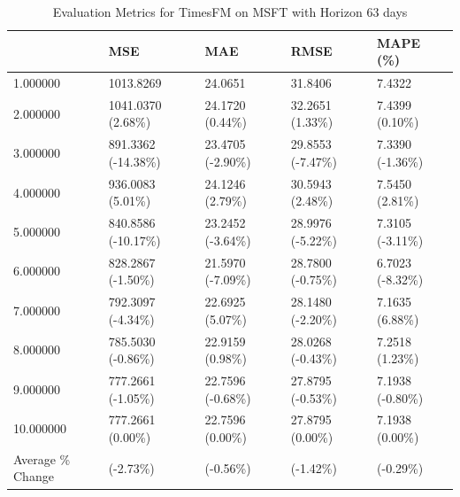 \begin{table}
\caption{Evaluation Metrics for TimesFM on MSFT with Horizon 63 days}
\label{tab:fm_MSFT_h63_metrics}
\begin{tabular}{lllll}
\toprule
 & MSE & MAE & RMSE & MAPE (\%) \\
\midrule
1.000000 & 1013.8269 & 24.0651 & 31.8406 & 7.4322 \\
2.000000 & 1041.0370 (2.68\%) & 24.1720 (0.44\%) & 32.2651 (1.33\%) & 7.4399 (0.10\%) \\
3.000000 & 891.3362 (-14.38\%) & 23.4705 (-2.90\%) & 29.8553 (-7.47\%) & 7.3390 (-1.36\%) \\
4.000000 & 936.0083 (5.01\%) & 24.1246 (2.79\%) & 30.5943 (2.48\%) & 7.5450 (2.81\%) \\
5.000000 & 840.8586 (-10.17\%) & 23.2452 (-3.64\%) & 28.9976 (-5.22\%) & 7.3105 (-3.11\%) \\
6.000000 & 828.2867 (-1.50\%) & 21.5970 (-7.09\%) & 28.7800 (-0.75\%) & 6.7023 (-8.32\%) \\
7.000000 & 792.3097 (-4.34\%) & 22.6925 (5.07\%) & 28.1480 (-2.20\%) & 7.1635 (6.88\%) \\
8.000000 & 785.5030 (-0.86\%) & 22.9159 (0.98\%) & 28.0268 (-0.43\%) & 7.2518 (1.23\%) \\
9.000000 & 777.2661 (-1.05\%) & 22.7596 (-0.68\%) & 27.8795 (-0.53\%) & 7.1938 (-0.80\%) \\
10.000000 & 777.2661 (0.00\%) & 22.7596 (0.00\%) & 27.8795 (0.00\%) & 7.1938 (0.00\%) \\
Average \% Change & (-2.73\%) & (-0.56\%) & (-1.42\%) & (-0.29\%) \\
\bottomrule
\end{tabular}
\end{table}
